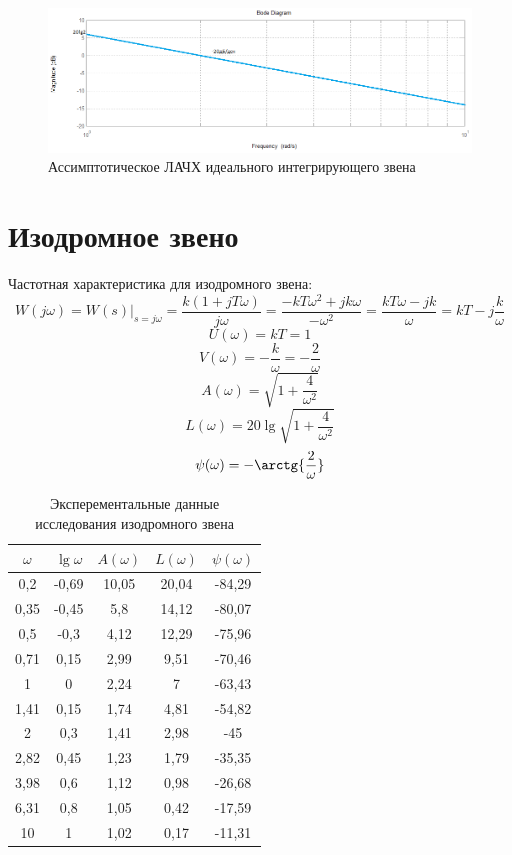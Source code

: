 \documentclass[a4paper, 11pt, russian]{article}
\begin{document}
    \begin{figure}[ht!]
        \centering
        \includegraphics[width = \textwidth]{integratingLinkAsymp}
        \caption{Ассимптотическое ЛАЧХ идеального интегрирующего звена}
    \end{figure}
    \clearpage
    \section{Изодромное звено}
    Частотная характеристика для изодромного звена:
    $$W(j\omega) = W(s)\big|_{s = j\omega} = \frac{k(1 + jT\omega)}{j\omega} = \frac{-kT\omega^2 + jk\omega}{-\omega^2} = \frac{kT\omega - jk}{\omega} = kT - j\frac{k}{\omega}$$
    $$U(\omega) = kT = 1$$
    $$V(\omega) = -\frac{k}{\omega} = -\frac{2}{\omega}$$
    $$A(\omega) = \sqrt{1 + \displaystyle{\frac{4}{\omega^2}}}$$
    $$L(\omega) = 20\lg{\sqrt{1 + \frac{4}{\omega^2}}}$$
    $$\psi(\omega) = -\arctg{\frac{2}{\omega}}$$
    \begin{table}[ht!]
        \flushleft
        \caption{Эксперементальные данные исследования изодромного звена}
        \begin{tabular}{c|c|c|c|c}
            $\omega$ & $\lg{\omega}$ & $A(\omega)$ & $L(\omega)$ & $\psi(\omega)$\\
            \hline
            0,2 & -0,69 & 10,05& 20,04& -84,29\\
            \hline
            0,35& -0,45 & 5,8  & 14,12& -80,07\\
            \hline
            0,5 & -0,3  & 4,12 & 12,29& -75,96\\
            \hline
            0,71& 0,15  & 2,99 & 9,51 & -70,46\\
            \hline
            1   & 0     & 2,24 & 7    & -63,43\\
            \hline
            1,41& 0,15  & 1,74 & 4,81 & -54,82\\
            \hline
            2   & 0,3   & 1,41 & 2,98 & -45\\ 
            \hline
            2,82& 0,45  & 1,23 & 1,79 & -35,35\\
            \hline
            3,98& 0,6   & 1,12 & 0,98 & -26,68\\
            \hline
            6,31& 0,8   & 1,05 & 0,42 & -17,59\\
            \hline
            10  & 1     & 1,02 & 0,17 & -11,31
        \end{tabular}
    \end{table}
\end{document}
